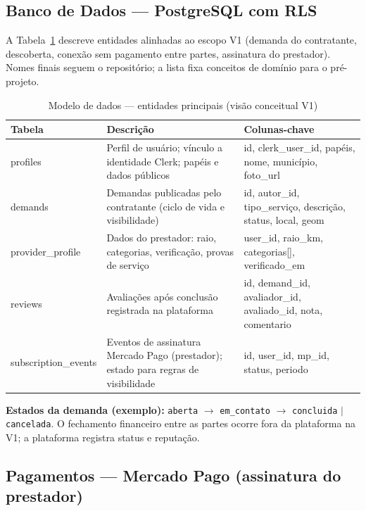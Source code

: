 \documentclass[12pt, a4paper]{article}
\newcommand{\code}[1]{%
  \texttt{\small\colorbox{codeGray}{\vphantom{Ag}#1}}}
\begin{document}
\subsection{Banco de Dados --- PostgreSQL com RLS}

A Tabela~\ref{tab:tabelas} descreve entidades alinhadas ao escopo V1
(demanda do contratante, descoberta, conexão sem pagamento entre
partes, assinatura do prestador). Nomes finais seguem o repositório;
a lista fixa conceitos de domínio para o pré-projeto.

\begin{table}[H]
  \centering
  \caption{Modelo de dados --- entidades principais (visão conceitual V1)}
  \label{tab:tabelas}
  \begin{tabularx}{\textwidth}{%
    >{\ttfamily\raggedright\arraybackslash}p{2.8cm}
    >{\raggedright\arraybackslash}X
    >{\raggedright\arraybackslash}p{4.2cm}}
  \toprule
  \rowcolor{ifcGreen!20}
  \textbf{Tabela} & \textbf{Descrição} & \textbf{Colunas-chave} \\
  \midrule
  profiles
    & Perfil de usuário; vínculo a identidade Clerk; papéis e dados públicos
    & id, clerk\_user\_id, papéis, nome, município, foto\_url \\
  \rowcolor{rowGray}
  demands
    & Demandas publicadas pelo contratante (ciclo de vida e visibilidade)
    & id, autor\_id, tipo\_serviço, descrição, status, local, geom \\
  provider\_profile
    & Dados do prestador: raio, categorias, verificação, provas de serviço
    & user\_id, raio\_km, categorias[], verificado\_em \\
  \rowcolor{rowGray}
  reviews
    & Avaliações após conclusão registrada na plataforma
    & id, demand\_id, avaliador\_id, avaliado\_id, nota, comentario \\
  subscription\_events
    & Eventos de assinatura Mercado Pago (prestador); estado para regras de visibilidade
    & id, user\_id, mp\_id, status, periodo \\
  \bottomrule
  \end{tabularx}
\end{table}

\textbf{Estados da demanda (exemplo):} \code{aberta}
$\rightarrow$ \code{em\_contato} $\rightarrow$ \code{concluida}
$|$ \code{cancelada}. O fechamento financeiro entre as partes ocorre
fora da plataforma na V1; a plataforma registra status e reputação.

\subsection{Pagamentos --- Mercado Pago (assinatura do prestador)}
\end{document}
